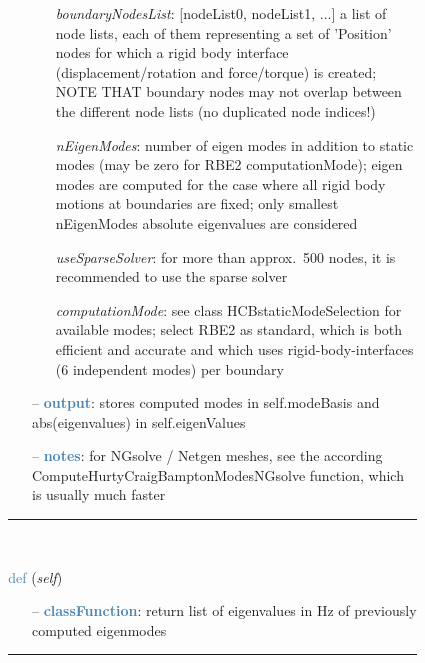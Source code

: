 \begin{itemize}[leftmargin=1.4cm]
\begin{itemize}[leftmargin=0.5cm]
\begin{itemize}[leftmargin=1.4cm]
\begin{itemize}[leftmargin=0.5cm]
\begin{itemize}[leftmargin=0.7cm]
  \begin{itemize}[leftmargin=1.2cm]
\setlength{\itemindent}{-0.7cm}
    \item[] {\it boundaryNodesList}: [nodeList0, nodeList1, ...] a list of node lists, each of them representing a set of 'Position' nodes for which a rigid body interface (displacement/rotation and force/torque) is created; NOTE THAT boundary nodes may not overlap between the different node lists (no duplicated node indices!)
    \item[] {\it   nEigenModes}: number of eigen modes in addition to static modes (may be zero for RBE2 computationMode); eigen modes are computed for the case where all rigid body motions at boundaries are fixed; only smallest nEigenModes absolute eigenvalues are considered
    \item[] {\it   useSparseSolver}: for more than approx.~500 nodes, it is recommended to use the sparse solver
    \item[] {\it   computationMode}: see class HCBstaticModeSelection for available modes; select RBE2 as standard, which is both efficient and accurate and which uses rigid-body-interfaces (6 independent modes) per boundary
  \end{itemize}
  \item[--]  \textcolor{steelblue}{\bf output}: stores computed modes in self.modeBasis and abs(eigenvalues) in self.eigenValues  \item[--]  \textcolor{steelblue}{\bf notes}: for NGsolve / Netgen meshes, see the according ComputeHurtyCraigBamptonModesNGsolve function, which is usually much faster\vspace{12pt}\end{itemize}
%
\noindent\rule{8cm}{0.75pt}\vspace{1pt} \\ 
\begin{flushleft}
\noindent \textcolor{steelblue}{def {\bf {}}}\label{sec:FEM:FEMinterface:GetEigenFrequenciesHz}
({\it self})
\end{flushleft}
\setlength{\itemindent}{0.7cm}
\begin{itemize}[leftmargin=0.7cm]
  \item[--]  \textcolor{steelblue}{\bf classFunction}: return list of eigenvalues in Hz of previously computed eigenmodes\vspace{12pt}\end{itemize}
%
\noindent\rule{8cm}{0.75pt}\vspace{1pt} \\ 

\end{itemize}
\end{itemize}
\end{itemize}
\end{itemize}
